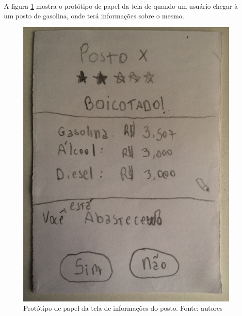 A figura \ref{img:prototipo_de_papel_info_posto} mostra o protótipo de papel da tela de quando um usuário chegar à um posto de gasolina, onde terá informações sobre o mesmo.
\begin{figure}[H]
    \centering
    \includegraphics[scale=0.1, angle=-90]{figuras/prototipo_papel_info_posto.jpg}
    \caption[Protótipo de papel da tela de informações do posto]{Protótipo de papel da tela de informações do posto. Fonte: autores}
    \label{img:prototipo_de_papel_info_posto}
\end{figure}
 \pagebreak

